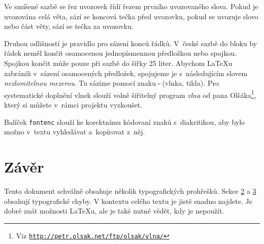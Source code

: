 \documentclass[a4paper, 10pt, twocolumn]{article}
\begin{document}
    Ve smíšené sazbě se řez uvozovek řídí řezem prvního uvozovaného slova.
    Pokud je uvozována celá věta, sází se koncová tečka před uvozovku, pokud se uvozuje slovo nebo část věty, sází se tečka za uvozovku.
    
    Druhou odlišností je pravidlo pro sázení konců řádků.
    V~české sazbě do bloku by řádek neměl končit osamocenou jednopísmennou předložkou nebo spojkou.
    Spojkou  končit může pouze při sazbě do šířky 25 liter.
    Abychom {\LaTeX}u zabránili v~sázení osamocených předložek, spojujeme je s~následujícím slovem \emph{nezlomitelnou mezerou}.
    Tu sázíme pomocí znaku\,{\textasciitilde}\,(vlnka, tilda).
    Pro systematické doplnění vlnek slouží volně šiřitelný program \emph{vlna} od pana Olšáka\footnote{Viz \texttt{\url{http://petr.olsak.net/ftp/olsak/vlna/}}}, který si můžete v~rámci projektu vyzkoušet.
    
    Balíček \texttt{fontenc} slouží ke korektnímu kódovaní znaků s~diakritikou, aby bylo možno v~textu vyhledávat a~kopírovat z~něj.
    
    \section{Závěr}
    \label{sec:5}
    Tento dokument schválně obsahuje několik typografických prohřešků.
    Sekce \hyperref[sec:2]{2} a \hyperref[sec:3]{3} obsahují typografické chyby.
    V kontextu celého textu je jistě snadno najdete.
    Je dobré znát možnosti {\LaTeX}u, ale je také nutné vědět, kdy je nepoužít.
    	
\end{document}
